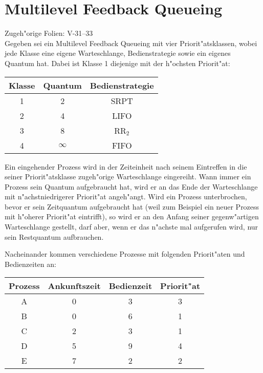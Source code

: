 \section{Multilevel Feedback Queueing}

Zugeh"orige Folien:  V-31--33 \\

Gegeben sei ein Multilevel Feedback Queueing mit vier
Priorit"atsklassen, wobei jede Klasse eine eigene Warteschlange,
Bedienstrategie sowie ein eigenes Quantum hat.  Dabei ist Klasse 1
diejenige mit der h"ochsten Priorit"at:

\begin{center}
  \begin{tabular}{ccc}
    \toprule
    Klasse & Quantum  & Bedienstrategie \\
    \midrule
    1      & 2        & SRPT \\
    2      & 4        & LIFO \\
    3      & 8        & RR${}_2$ \\
    4      & $\infty$ & FIFO \\
    \bottomrule
  \end{tabular}
\end{center}

Ein eingehender Prozess wird in der Zeiteinheit nach seinem Eintreffen
in die seiner Priorit"atsklasse zugeh"orige Warteschlange eingereiht.
Wann immer ein Prozess sein Quantum aufgebraucht hat, wird er an das
Ende der Warteschlange mit n"achstniedrigerer Priorit"at angeh"angt.
Wird ein Prozess unterbrochen, bevor er sein Zeitquantum aufgebraucht
hat (weil zum Beispiel ein neuer Prozess mit h"oherer Priorit"at
eintrifft), so wird er an den Anfang seiner gegenw"artigen
Warteschlange gestellt, darf aber, wenn er das n"achste mal aufgerufen
wird, nur sein Restquantum aufbrauchen.

Nacheinander kommen verschiedene Prozesse mit folgenden Priorit"aten und
Bedienzeiten an:

\begin{center}
  \begin{tabular}{cccc}
    \toprule
    Prozess & Ankunftszeit & Bedienzeit & Priorit"at \\
    \midrule
    A       & 0            & 3          & 3 \\
    B       & 0            & 6          & 1 \\
    C       & 2            & 3          & 1 \\
    D       & 5            & 9          & 4 \\
    E       & 7            & 2          & 2 \\
    \bottomrule
  \end{tabular}
\end{center}

